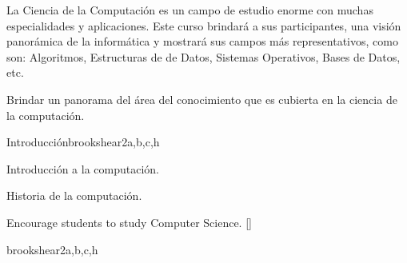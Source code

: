 \begin{syllabus}


\begin{justification}
La Ciencia de la Computación es un campo de estudio enorme con muchas especialidades y aplicaciones. Este curso brindará a sus participantes, una visión panorámica de la informática y mostrará sus campos más representativos, como son: Algoritmos, Estructuras de de Datos, Sistemas Operativos, Bases de Datos, etc.
\end{justification}

\begin{goals}
\item Brindar un panorama del área del conocimiento que es cubierta en la ciencia de la computación.
\end{goals}



\begin{unit}{}{Introducción}{brookshear}{2}{a,b,c,h}
    \begin{topics}
	\item Introducción a la computación.
	\item Historia de la computación.
   \end{topics}
   \begin{learningoutcomes}
      \item Encourage students to study Computer Science. [\Familiarity]
   \end{learningoutcomes}
\end{unit}

\begin{unit}{\DSBasicLogic}{}{brookshear}{2}{a,b,c,h}
   \begin{topics}
      \item \DSBasicLogicTopicPropositional
      \item \DSBasicLogicTopicLogical
      \item \DSBasicLogicTopicTruth
      \item \DSBasicLogicTopicNormal
   \end{topics}
   \begin{learningoutcomes}
      \item \DSBasicLogicLOConvertLogical[\Familiarity]
      \item \DSBasicLogicLOApplyFormal [\Familiarity]
   \end{learningoutcomes}
\end{unit}

\begin{coursebibliography}
\end{coursebibliography}
\end{syllabus}
%
